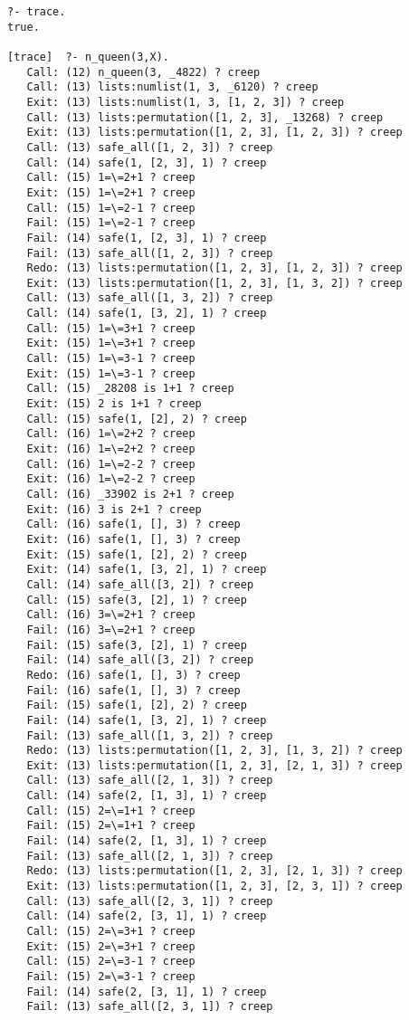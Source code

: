 \documentclass{article}
\begin{document}
\begin{lstlisting}
?- trace.
true.

[trace]  ?- n_queen(3,X).
   Call: (12) n_queen(3, _4822) ? creep
   Call: (13) lists:numlist(1, 3, _6120) ? creep
   Exit: (13) lists:numlist(1, 3, [1, 2, 3]) ? creep
   Call: (13) lists:permutation([1, 2, 3], _13268) ? creep
   Exit: (13) lists:permutation([1, 2, 3], [1, 2, 3]) ? creep
   Call: (13) safe_all([1, 2, 3]) ? creep
   Call: (14) safe(1, [2, 3], 1) ? creep
   Call: (15) 1=\=2+1 ? creep
   Exit: (15) 1=\=2+1 ? creep
   Call: (15) 1=\=2-1 ? creep
   Fail: (15) 1=\=2-1 ? creep
   Fail: (14) safe(1, [2, 3], 1) ? creep
   Fail: (13) safe_all([1, 2, 3]) ? creep
   Redo: (13) lists:permutation([1, 2, 3], [1, 2, 3]) ? creep
   Exit: (13) lists:permutation([1, 2, 3], [1, 3, 2]) ? creep
   Call: (13) safe_all([1, 3, 2]) ? creep
   Call: (14) safe(1, [3, 2], 1) ? creep
   Call: (15) 1=\=3+1 ? creep
   Exit: (15) 1=\=3+1 ? creep
   Call: (15) 1=\=3-1 ? creep
   Exit: (15) 1=\=3-1 ? creep
   Call: (15) _28208 is 1+1 ? creep
   Exit: (15) 2 is 1+1 ? creep
   Call: (15) safe(1, [2], 2) ? creep
   Call: (16) 1=\=2+2 ? creep
   Exit: (16) 1=\=2+2 ? creep
   Call: (16) 1=\=2-2 ? creep
   Exit: (16) 1=\=2-2 ? creep
   Call: (16) _33902 is 2+1 ? creep
   Exit: (16) 3 is 2+1 ? creep
   Call: (16) safe(1, [], 3) ? creep
   Exit: (16) safe(1, [], 3) ? creep
   Exit: (15) safe(1, [2], 2) ? creep
   Exit: (14) safe(1, [3, 2], 1) ? creep
   Call: (14) safe_all([3, 2]) ? creep
   Call: (15) safe(3, [2], 1) ? creep
   Call: (16) 3=\=2+1 ? creep
   Fail: (16) 3=\=2+1 ? creep
   Fail: (15) safe(3, [2], 1) ? creep
   Fail: (14) safe_all([3, 2]) ? creep
   Redo: (16) safe(1, [], 3) ? creep
   Fail: (16) safe(1, [], 3) ? creep
   Fail: (15) safe(1, [2], 2) ? creep
   Fail: (14) safe(1, [3, 2], 1) ? creep
   Fail: (13) safe_all([1, 3, 2]) ? creep
   Redo: (13) lists:permutation([1, 2, 3], [1, 3, 2]) ? creep
   Exit: (13) lists:permutation([1, 2, 3], [2, 1, 3]) ? creep
   Call: (13) safe_all([2, 1, 3]) ? creep
   Call: (14) safe(2, [1, 3], 1) ? creep
   Call: (15) 2=\=1+1 ? creep
   Fail: (15) 2=\=1+1 ? creep
   Fail: (14) safe(2, [1, 3], 1) ? creep
   Fail: (13) safe_all([2, 1, 3]) ? creep
   Redo: (13) lists:permutation([1, 2, 3], [2, 1, 3]) ? creep
   Exit: (13) lists:permutation([1, 2, 3], [2, 3, 1]) ? creep
   Call: (13) safe_all([2, 3, 1]) ? creep
   Call: (14) safe(2, [3, 1], 1) ? creep
   Call: (15) 2=\=3+1 ? creep
   Exit: (15) 2=\=3+1 ? creep
   Call: (15) 2=\=3-1 ? creep
   Fail: (15) 2=\=3-1 ? creep
   Fail: (14) safe(2, [3, 1], 1) ? creep
   Fail: (13) safe_all([2, 3, 1]) ? creep

\end{lstlisting}
\end{document}

